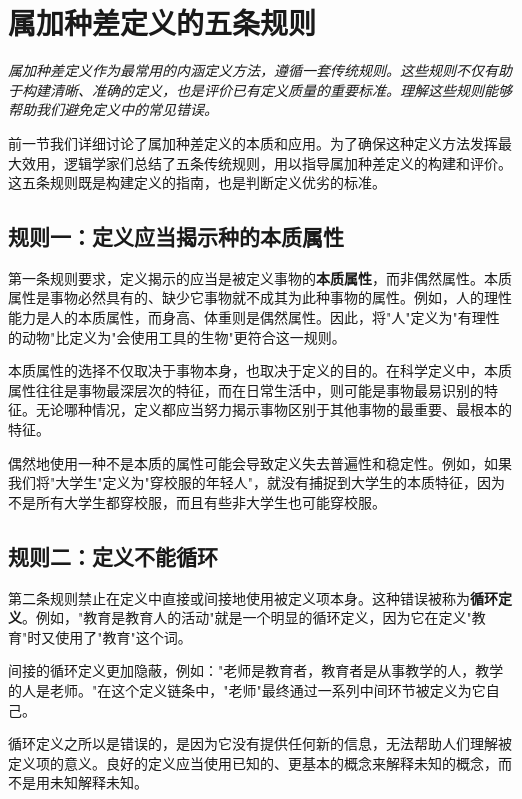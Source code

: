 \section{属加种差定义的五条规则}

\begin{logicbox}[title=引言]
\textit{属加种差定义作为最常用的内涵定义方法，遵循一套传统规则。这些规则不仅有助于构建清晰、准确的定义，也是评价已有定义质量的重要标准。理解这些规则能够帮助我们避免定义中的常见错误。}
\end{logicbox}

前一节我们详细讨论了属加种差定义的本质和应用。为了确保这种定义方法发挥最大效用，逻辑学家们总结了五条传统规则，用以指导属加种差定义的构建和评价。这五条规则既是构建定义的指南，也是判断定义优劣的标准。

\subsection{规则一：定义应当揭示种的本质属性}

第一条规则要求，定义揭示的应当是被定义事物的\textbf{本质属性}，而非偶然属性。本质属性是事物必然具有的、缺少它事物就不成其为此种事物的属性。例如，人的理性能力是人的本质属性，而身高、体重则是偶然属性。因此，将"人"定义为"有理性的动物"比定义为"会使用工具的生物"更符合这一规则。

本质属性的选择不仅取决于事物本身，也取决于定义的目的。在科学定义中，本质属性往往是事物最深层次的特征，而在日常生活中，则可能是事物最易识别的特征。无论哪种情况，定义都应当努力揭示事物区别于其他事物的最重要、最根本的特征。

偶然地使用一种不是本质的属性可能会导致定义失去普遍性和稳定性。例如，如果我们将"大学生"定义为"穿校服的年轻人"，就没有捕捉到大学生的本质特征，因为不是所有大学生都穿校服，而且有些非大学生也可能穿校服。

\subsection{规则二：定义不能循环}

第二条规则禁止在定义中直接或间接地使用被定义项本身。这种错误被称为\textbf{循环定义}。例如，"教育是教育人的活动"就是一个明显的循环定义，因为它在定义"教育"时又使用了"教育"这个词。

间接的循环定义更加隐蔽，例如："老师是教育者，教育者是从事教学的人，教学的人是老师。"在这个定义链条中，"老师"最终通过一系列中间环节被定义为它自己。

循环定义之所以是错误的，是因为它没有提供任何新的信息，无法帮助人们理解被定义项的意义。良好的定义应当使用已知的、更基本的概念来解释未知的概念，而不是用未知解释未知。

